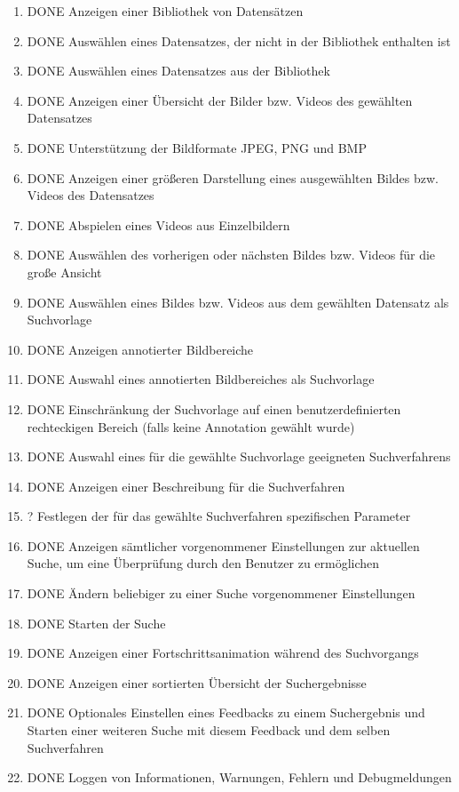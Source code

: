 \begin{enumerate} [label=\bfseries /F \arabic*0/, leftmargin=*]
	\item DONE Anzeigen einer Bibliothek von Datensätzen
	\item DONE Auswählen eines Datensatzes, der nicht in der Bibliothek enthalten ist
	\item DONE Auswählen eines Datensatzes aus der Bibliothek
	\item DONE Anzeigen einer Übersicht der Bilder bzw. Videos des gewählten Datensatzes
	\item DONE Unterstützung der Bildformate JPEG, PNG und BMP
	\item DONE Anzeigen einer größeren Darstellung eines ausgewählten Bildes bzw. Videos des Datensatzes
	\item DONE Abspielen eines Videos aus Einzelbildern
	\item DONE Auswählen des vorherigen oder nächsten Bildes bzw. Videos für die große Ansicht
	\item DONE Auswählen eines Bildes bzw. Videos aus dem gewählten Datensatz als Suchvorlage
	\item DONE Anzeigen annotierter Bildbereiche
	\item DONE Auswahl eines annotierten Bildbereiches als Suchvorlage
	\item DONE Einschränkung der Suchvorlage auf einen benutzerdefinierten rechteckigen Bereich (falls keine Annotation gewählt wurde)
	\item DONE Auswahl eines für die gewählte Suchvorlage geeigneten Suchverfahrens
	\item DONE Anzeigen einer Beschreibung für die Suchverfahren
	\item ? Festlegen der für das gewählte Suchverfahren spezifischen Parameter
	\item DONE Anzeigen sämtlicher vorgenommener Einstellungen zur aktuellen Suche, um eine Überprüfung durch den Benutzer zu ermöglichen
	\item DONE Ändern beliebiger zu einer Suche vorgenommener Einstellungen
	\newline
	\item DONE Starten der Suche
	\item DONE Anzeigen einer Fortschrittsanimation während des Suchvorgangs
	\newline
	\item DONE Anzeigen einer sortierten Übersicht der Suchergebnisse
	\item DONE Optionales Einstellen eines Feedbacks zu einem Suchergebnis und Starten einer weiteren Suche mit diesem Feedback und dem selben Suchverfahren
	
	\item DONE Loggen von Informationen, Warnungen, Fehlern und Debugmeldungen
	 
\end{enumerate}

